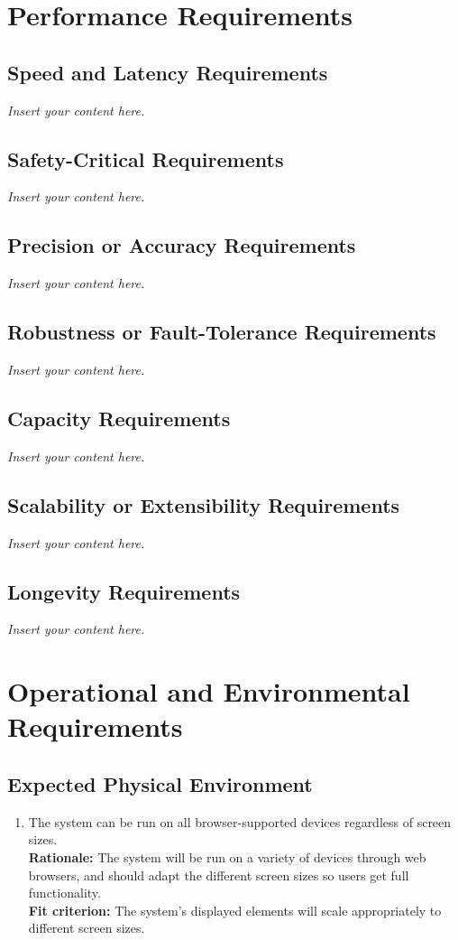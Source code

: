 \documentclass[12pt]{article}
\newcommand{\lips}{\textit{Insert your content here.}}
\begin{document}
\section{Performance Requirements}
\subsection{Speed and Latency Requirements}
\lips
\subsection{Safety-Critical Requirements}
\lips
\subsection{Precision or Accuracy Requirements}
\lips
\subsection{Robustness or Fault-Tolerance Requirements}
\lips
\subsection{Capacity Requirements}
\lips
\subsection{Scalability or Extensibility Requirements}
\lips
\subsection{Longevity Requirements}
\lips

\section{Operational and Environmental Requirements}
\subsection{Expected Physical Environment}
\begin{enumerate}[{OE-EPE}1. ]
  \item The system can be run on all browser-supported devices regardless of screen sizes.\\
  \textbf{Rationale: }The system will be run on a variety of devices through web browsers, and should adapt the different screen sizes so users get full functionality.\\
  \textbf{Fit criterion: }The system's displayed elements will scale appropriately to different screen sizes.
\end{enumerate}
\end{document}
